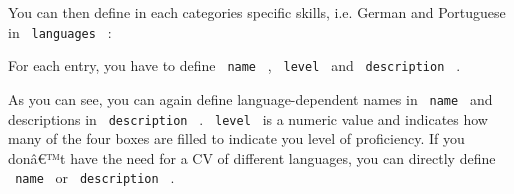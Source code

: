 \begin{Shaded}
\begin{Highlighting}[]
\KeywordTok{:}
\KeywordTok{:}
\KeywordTok{:}
\end{Highlighting}
\end{Shaded}

You can then define in each categories specific skills, i.e. German and
Portuguese in \texttt{\ languages\ } :

\begin{Shaded}
\begin{Highlighting}[]
\KeywordTok{:}
\KeywordTok{:}
\KeywordTok{:}
\AttributeTok{  }\KeywordTok{:}
\AttributeTok{  }\KeywordTok{:}
\end{Highlighting}
\end{Shaded}

For each entry, you have to define \texttt{\ name\ } ,
\texttt{\ level\ } and \texttt{\ description\ } .

\begin{Shaded}
\begin{Highlighting}[]
\KeywordTok{:}\AttributeTok{ }
\AttributeTok{  }\KeywordTok{:}\AttributeTok{ }
\AttributeTok{    }\KeywordTok{:}
\AttributeTok{      }\KeywordTok{:}
\AttributeTok{      }\KeywordTok{:}
\AttributeTok{      }\KeywordTok{:}
\AttributeTok{    }\KeywordTok{:}\AttributeTok{ }
\AttributeTok{    }\KeywordTok{:}
\AttributeTok{      }\KeywordTok{:}
\AttributeTok{      }\KeywordTok{:}
\AttributeTok{      }\KeywordTok{:}
\end{Highlighting}
\end{Shaded}

As you can see, you can again define language-dependent names in
\texttt{\ name\ } and descriptions in \texttt{\ description\ } .
\texttt{\ level\ } is a numeric value and indicates how many of the four
boxes are filled to indicate you level of proficiency. If you donâ€™t
have the need for a CV of different languages, you can directly define
\texttt{\ name\ } or \texttt{\ description\ } .

